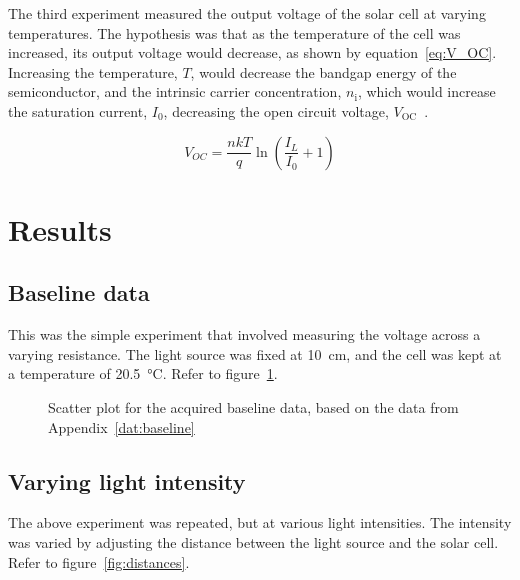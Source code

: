 \documentclass[a4paper,11pt]{article}
\begin{document}
The third experiment measured the output voltage of the solar cell at varying temperatures. The hypothesis was that as the temperature of the cell was increased, its output voltage would decrease, as shown by equation~\ref{eq:V_OC}. Increasing the temperature, $T$, would decrease the bandgap energy of the semiconductor, and the intrinsic carrier concentration, $n_{\textrm{i}}$, which would increase the saturation current, $I_0$, decreasing the open circuit voltage, $V_{\textrm{OC}}$~\cite{pveTemperature}.

\begin{equation} \label{eq:V_OC}
V_{OC} = \frac{nkT}{q}\ln{\left(\frac{I_L}{I_0} + 1\right)}
\end{equation}


\section{Results}
\subsection{Baseline data}

This was the simple experiment that involved measuring the voltage across a varying resistance. The light source was fixed at \SI{10}{\centi\metre}, and the cell was kept at a temperature of \SI{20.5}{\celsius}. Refer to figure~\ref{plot:baseline}.

\begin{figure}[h]
\centering
{}
\caption{Scatter plot for the acquired baseline data, based on the data from Appendix~\ref{dat:baseline}}
\label{plot:baseline}
\end{figure}

\subsection{Varying light intensity}

The above experiment was repeated, but at various light intensities. The intensity was varied by adjusting the distance between the light source and the solar cell. Refer to figure~\ref{fig:distances}.
\end{document}
